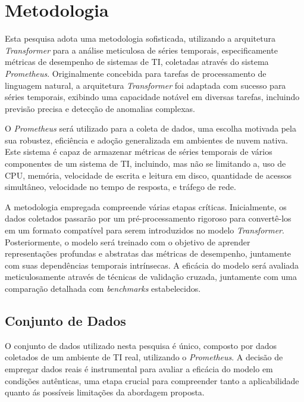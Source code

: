 \chapter{Metodologia} \label{Cap_metodologia}

Esta pesquisa adota uma metodologia sofisticada, utilizando a arquitetura \textit{Transformer} para a análise meticulosa de séries temporais, especificamente métricas de desempenho de sistemas de TI, coletadas através do sistema \textit{Prometheus}. Originalmente concebida para tarefas de processamento de linguagem natural, a arquitetura \textit{Transformer} foi adaptada com sucesso para séries temporais, exibindo uma capacidade notável em diversas tarefas, incluindo previsão precisa e detecção de anomalias complexas.

O \textit{Prometheus} será utilizado para a coleta de dados, uma escolha motivada pela sua robustez, eficiência e adoção generalizada em ambientes de nuvem nativa. Este sistema é capaz de armazenar métricas de séries temporais de vários componentes de um sistema de TI, incluindo, mas não se limitando a, uso de CPU, memória, velocidade de escrita e leitura em disco, quantidade de acessos simultâneo, velocidade no tempo de resposta, e tráfego de rede.

A metodologia empregada compreende várias etapas críticas. Inicialmente, os dados coletados passarão por um pré-processamento rigoroso para convertê-los em um formato compatível para serem introduzidos no modelo \textit{Transformer}. Posteriormente, o modelo será treinado com o objetivo de aprender representações profundas e abstratas das métricas de desempenho, juntamente com suas dependências temporais intrínsecas. A eficácia do modelo será avaliada meticulosamente através de técnicas de validação cruzada, juntamente com uma comparação detalhada com \textit{benchmarks} estabelecidos.

\section{Conjunto de Dados}

O conjunto de dados utilizado nesta pesquisa é único, composto por dados coletados de um ambiente de TI real, utilizando o \textit{Prometheus}. A decisão de empregar dados reais é instrumental para avaliar a eficácia do modelo em condições autênticas, uma etapa crucial para compreender tanto a aplicabilidade quanto ás possíveis limitações da abordagem proposta. 

